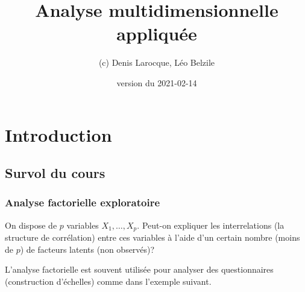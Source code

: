 \documentclass[
  11pt,
  letterpaper,
]{book}
\title{Analyse multidimensionnelle appliquée}
\author{(c) Denis Larocque, Léo Belzile}
\date{version du 2021-02-14}
\theoremstyle{definition}
\theoremstyle{definition}
\theoremstyle{definition}
\theoremstyle{remark}
\begin{document}
\maketitle

{
\setcounter{tocdepth}{1}
\tableofcontents
}
\hypertarget{introduction}{%
\chapter{Introduction}\label{introduction}}

\newcommand{\bs}[1]{\boldsymbol{#1}}
\newcommand{\eps}{\varepsilon}
\newcommand{\Rlang}{\textsf{R}}
\newcommand{\SAS}{\textsf{SAS}}
\newcommand{\Sp}{\mathscr{S}}
\renewcommand{\P}[1]{{\mathsf P}\left(#1\right)}
\newcommand{\E}[1]{{\mathsf E}\left(#1\right)}
\newcommand{\Va}[1]{{\mathsf{Var}}\left(#1\right)}
\newcommand{\Cor}[1]{{\mathsf{Cor}}\left(#1\right)}
\newcommand{\I}[1]{{\mathbf 1}_{#1}}
\newcommand{\expit}{\mathrm{expit}}
\newcommand{\logit}{\mathrm{logit}}
\newcommand{\code}[1]{\texttt{#1}}
\newcommand{\Hy}{\mathcal{H}}
\renewcommand{\d}{\mathrm{d}}

\hypertarget{survol-du-cours}{%
\section{Survol du cours}\label{survol-du-cours}}

\hypertarget{analyse-factorielle-exploratoire}{%
\subsection{Analyse factorielle exploratoire}\label{analyse-factorielle-exploratoire}}

On dispose de \(p\) variables \(X_1, \ldots, X_p\). Peut-on expliquer les interrelations (la structure de corrélation) entre ces variables à l'aide d'un certain nombre (moins de \(p\)) de facteurs latents (non observés)?

L'analyse factorielle est souvent utilisée pour analyser des questionnaires (construction d'échelles) comme dans l'exemple suivant.
\end{document}
